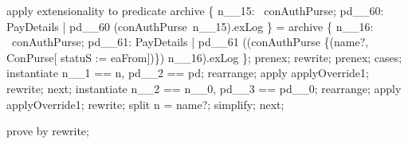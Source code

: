 \begin{LPScript}
\begin{zproof}[lPromotedAuxWorldAckType]
        apply extensionality to predicate
            archive \cup \{ n\_\_15: \dom~conAuthPurse; pd\_\_60: PayDetails
                | pd\_\_60 \in (conAuthPurse~n\_\_15).exLog \}
            = archive \cup \{ n\_\_16: \dom~conAuthPurse; pd\_\_61: PayDetails
                | pd\_\_61 \in ((conAuthPurse \oplus \{(name?, \theta ConPurse[
                    statuS := eaFrom])\}) n\_\_16).exLog \};
        prenex;
        rewrite;
        prenex;
        cases;
            instantiate n\_\_1 == n, pd\_\_2 == pd;
            rearrange;
            apply applyOverride1;
            rewrite;
        next;
            instantiate n\_\_2 == n\_\_0, pd\_\_3 == pd\_\_0;
            rearrange;
            apply applyOverride1;
            rewrite;
            split \lnot n = name?;
            simplify;
    next;
\end{zproof}\end{LPScript}

\begin{LDCheck}\begin{zproof}
    prove by rewrite;
\end{zproof}\end{LDCheck}

